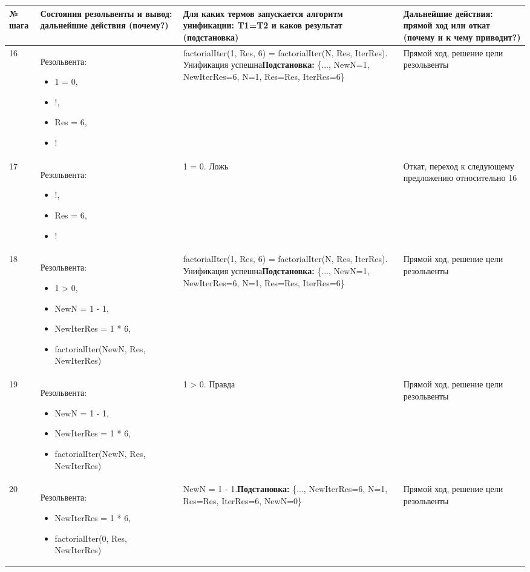 \documentclass[14pt,a4paper]{scrreprt}
\begin{document}
\begin{table}[H]
	\begin{tabular}{|p{0.8cm\small}|p{4.7cm\small}|p{5.7cm\small}|p{4cm\small}|}	
		\hline
		№ шага & Состояния резольвенты и вывод: дальнейшие действия (почему?) & Для каких термов запускается алгоритм унификации: T1=T2 и каков результат (подстановка) & Дальнейшие действия: прямой ход или откат (почему и к чему приводит?)\\
		\hline
		16 & Резольвента:\begin{itemize} \item 1 = 0, \item !, \item Res = 6, \item ! \end{itemize} & factorialIter(1, Res, 6) = factorialIter(N, Res, IterRes). Унификация успешна\linebreak \textbf{Подстановка:} \{..., NewN=1, NewIterRes=6, N=1, Res=Res, IterRes=6\} & Прямой ход, решение цели резольвенты\\
		\hline
		17 & Резольвента:\begin{itemize} \item !, \item Res = 6, \item ! \end{itemize} & 1 = 0. Ложь & Откат, переход к следующему предложению относительно 16\\
		\hline
		18 & Резольвента:\begin{itemize} \item 1 > 0, \item NewN = 1 - 1, 
		\item NewIterRes = 1 * 6,
\item factorialIter(NewN, Res, NewIterRes) \end{itemize} & factorialIter(1, Res, 6) = factorialIter(N, Res, IterRes). Унификация успешна\linebreak \textbf{Подстановка:} \{..., NewN=1, NewIterRes=6, N=1, Res=Res, IterRes=6\} & Прямой ход, решение цели резольвенты\\
		\hline
		19 & Резольвента:\begin{itemize} \item NewN = 1 - 1, 
		\item NewIterRes = 1 * 6,
\item factorialIter(NewN, Res, NewIterRes) \end{itemize} & 1 > 0. Правда & Прямой ход, решение цели резольвенты\\
		\hline
		20 & Резольвента:\begin{itemize} \item NewIterRes = 1 * 6,
\item factorialIter(0, Res, NewIterRes) \end{itemize} & NewN = 1 - 1.\linebreak \textbf{Подстановка:} \{..., NewIterRes=6, N=1, Res=Res, IterRes=6, NewN=0\} & Прямой ход, решение цели резольвенты\\
		\hline
	\end{tabular}
\end{table}
\end{document}

